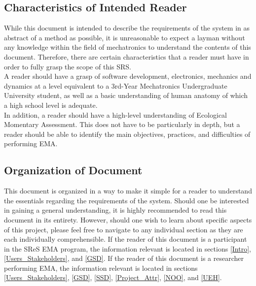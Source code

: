\documentclass[12pt]{article}
\begin{document}
\subsection{Characteristics of Intended Reader} \label{sec_IntendedReader}

While this document is intended to describe the requirements of the system in as abstract of a method as possible, it is unreasonable to expect a layman without any knowledge within the field of mechatronics to understand the contents of this document. Therefore, there are certain characteristics that a reader must have in order to fully grasp the scope of this SRS. \\

A reader should have a grasp of software development, electronics, mechanics and dynamics at a level equivalent to a 3rd-Year Mechatronics Undergraduate University student, as well as a basic understanding of human anatomy of which a high school level is adequate. \\

In addition, a reader should have a high-level understanding of Ecological Momentary Assessment. This does not have to be particularly in depth, but a reader should be able to identify the main objectives, practices, and difficulties of performing EMA. \\

\subsection{Organization of Document}
This document is organized in a way to make it simple for a reader to understand the essentials regarding the requirements of the system. Should one be interested in gaining a general understanding, it is highly recommended to read this document in its entirety. However, should one wish to learn about specific aspects of this project, please feel free to navigate to any individual section as they are each individually comprehensible. If the reader of this document is a participant in the SReS EMA program, the information relevant is located in sections \ref{Intro}, \ref{Users_Stakeholders}, and \ref{GSD}. If the reader of this document is a researcher performing EMA, the information relevant is located in sections \ref{Users_Stakeholders}, \ref{GSD}, \ref{SSD}, \ref{Project_Attr}, \ref{NOO}, and \ref{UEH}.\\ 



\end{document}
